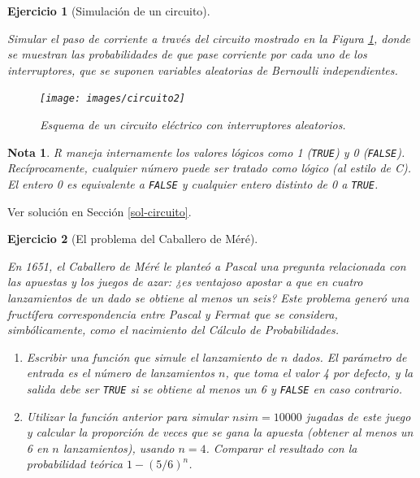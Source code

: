 \documentclass[
]{book}
\theoremstyle{break}
\newtheorem{exercise}{Ejercicio}[chapter]
\theoremstyle{nonumberplain}
\newtheorem{remark}{Nota}
\begin{document}
\begin{exercise}[Simulación de un circuito]
\protect\hypertarget{exr:circuito}{}\label{exr:circuito}

Simular el paso de corriente a través del circuito mostrado en la Figura \ref{fig:circuito2}, donde se muestran las probabilidades de que pase corriente por cada uno de los interruptores, que se suponen variables aleatorias de Bernoulli independientes.

\begin{figure}[!htb]

{\centering \texttt{[image: images/circuito2]} 

}

\caption{Esquema de un circuito eléctrico con interruptores aleatorios.}\label{fig:circuito2}
\end{figure}

\end{exercise}

\begin{remark}
R maneja internamente los valores lógicos como 1 (\texttt{TRUE}) y 0 (\texttt{FALSE}).
Recíprocamente, cualquier número puede ser tratado como lógico (al estilo de C).
El entero 0 es equivalente a \texttt{FALSE} y cualquier entero distinto de 0 a \texttt{TRUE}.
\end{remark}

Ver solución en Sección \ref{sol-circuito}.

\begin{exercise}[El problema del Caballero de Méré]
\protect\hypertarget{exr:mere}{}\label{exr:mere}

En 1651, el Caballero de Méré le planteó a Pascal una pregunta
relacionada con las apuestas y los juegos de azar: ¿es ventajoso
apostar a que en cuatro lanzamientos de un dado se obtiene al menos
un seis? Este problema generó una fructífera correspondencia entre
Pascal y Fermat que se considera, simbólicamente, como el nacimiento
del Cálculo de Probabilidades.

\begin{enumerate}
\def\labelenumi{\alph{enumi})}
\item
  Escribir una función que simule el lanzamiento de \(n\) dados. El
  parámetro de entrada es el número de lanzamientos \(n\), que toma
  el valor 4 por defecto, y la salida debe ser \texttt{TRUE} si se
  obtiene al menos un 6 y \texttt{FALSE} en caso contrario.
\item
  Utilizar la función anterior para simular \(nsim=10000\) jugadas
  de este juego y calcular la proporción de veces que se gana la
  apuesta (obtener al menos un 6 en \(n\) lanzamientos), usando
  \(n=4\). Comparar el resultado con la probabilidad teórica
  \(1-(5/6)^{n}\).
\end{enumerate}

\end{exercise}
\end{document}
